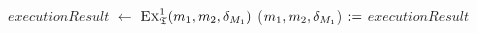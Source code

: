 \begin{algorithmic}[1]
            \State \Return{$\bot$}
        \EndIf
            \State $executionResult$ $\leftarrow$ $\textsc{Ex}_{\mathfrak{T}}^1(m_{1}, m_{2}, \delta_{M_{1}})$
                \State \Return{$\bot$} \label{algo:synchronization:executebidirectionaltransformation:line:returnbot}
            \Else
                \State ($m_{1}, m_{2}, \delta_{M_{1}}$) $:=$ $executionResult$
            \EndIf
        \EndWhile
        \State {} \label{algo:synchronization:executebidirectionaltransformation:line:returnresult}
    \EndProcedure
\end{algorithmic}